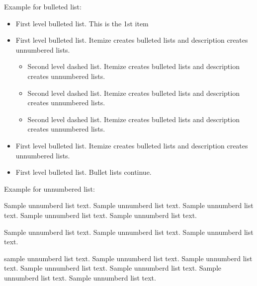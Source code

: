 \documentclass{sysbio}%
\begin{document}
Example for bulleted list:
\begin{itemize}
\item First level bulleted list. This is the 1st item

\item First level bulleted list. Itemize creates bulleted lists and description creates unnumbered lists.
\begin{itemize}
\item Second level dashed list. Itemize creates bulleted lists and description creates unnumbered lists.

\item Second level dashed list. Itemize creates bulleted lists and description creates unnumbered lists.

\item Second level dashed list. Itemize creates bulleted lists and description creates unnumbered lists.
\end{itemize}

\item First level bulleted list. Itemize creates bulleted lists and description creates unnumbered lists.

\item First level bulleted list. Bullet lists continue.
\end{itemize}

\noindent
Example for unnumbered list:
\begin{description}
\item Sample unnumberd list text. Sample unnumberd list text. Sample unnumberd list text. Sample unnumberd list text. Sample unnumberd list text.

\item Sample unnumberd list text. Sample unnumberd list text. Sample unnumberd list text.

\item sample unnumberd list text. Sample unnumberd list text. Sample unnumberd list text. Sample unnumberd list text. Sample unnumberd list text. Sample unnumberd list text. Sample unnumberd list text.


\end{description}
\end{document}
